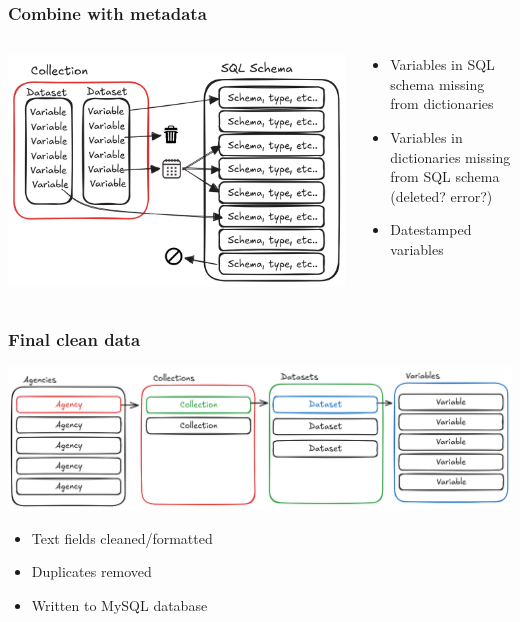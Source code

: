 \documentclass[aspectratio=169]{beamer}
\begin{document}
\begin{frame}
    \frametitle{Combine with metadata}

    \begin{columns}
        \begin{column}{0.5\textwidth}
            \begin{center}
                \includegraphics[width=0.8\linewidth]{dd-merge.png}
            \end{center}
        \end{column}
        \begin{column}{0.5\textwidth}
            \begin{itemize}
                \item Variables in SQL schema missing from dictionaries
                \item Variables in dictionaries missing from SQL schema (deleted? error?)
                \item Datestamped variables
            \end{itemize}
        \end{column}
    \end{columns}

\end{frame}

\begin{frame}
    \frametitle{Final clean data}

    \begin{center}
        \includegraphics[width=0.7\linewidth]{dd-result.png}
    \end{center}

    \begin{itemize}
        \item Text fields cleaned/formatted
        \item Duplicates removed
        \item Written to MySQL database
    \end{itemize}

\end{frame}
\end{document}
